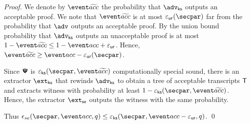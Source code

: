 \begin{proof}
	We denote by $\waccProb$ the probability that $\advcss$ outputs an acceptable proof. We note that $\waccProb$ is at most $\epsur (\secpar)$ far from the probability that $\advse$ outputs an acceptable proof. By the union bound probability that $\advcss$ outputs an unacceptable proof is at most $1 - \waccProb \leq 1 - \accProb + \epsur$. Hence, $\waccProb \geq \accProb - \epsur (\secpar)$. 

	Since $\bm{\mathsf{\Psi}}$ is $\epscss (\secpar, \waccProb)$ computationally special sound, there is an extractor $\extcss$ that rewinds $\advcss$ to obtain a tree of acceptable transcripts $\mathsf{T}$ and extracts witness with probability at least $1 - \epscss (\secpar, \waccProb)$. Hence, the extractor $\extse$ outputs the witness with the same probability.

	Thus $\epsilon_{se}(\secpar,\accProb,q) \leq \epscss(\secpar,\accProb - \epsur,q)$.
	\qed
	\end{proof}

	



